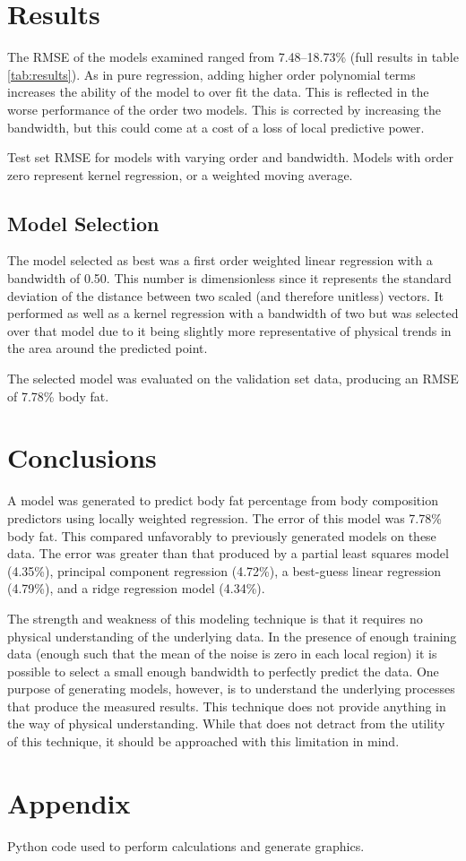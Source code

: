 \documentclass{IEEEtran}
\begin{document}
\section{Results}

The RMSE of the models examined ranged from \numrange{7.48}{18.73}\% (full results in table \ref{tab:results}). As in pure regression, adding higher order polynomial terms increases the ability of the model to over fit the data. This is reflected in the worse performance of the order two models. This is corrected by increasing the bandwidth, but this could come at a cost of a loss of local predictive power. 

\begin{table}[ht]
\caption{Test set RMSE for models with varying order and bandwidth. Models with order zero represent kernel regression, or a weighted moving average.}
\label{tab:results}
\center

\end{table}

\subsection{Model Selection}
The model selected as best was a first order weighted linear regression with a bandwidth of \num{0.50}. This number is dimensionless since it represents the standard deviation of the distance between two scaled (and therefore unitless) vectors. It performed as well as a kernel regression with a bandwidth of two but was selected over that model due to it being slightly more representative of physical trends in the area around the predicted point.

The selected model was evaluated on the validation set data, producing an RMSE of \num{7.78}\% body fat.
\section{Conclusions}

A model was generated to predict body fat percentage from body composition predictors using locally weighted regression. The error of this model was \num{7.78}\% body fat. This compared unfavorably to previously generated models on these data. The error was greater than that produced by a partial least squares model (\num{4.35}\%), principal component regression (\num{4.72}\%), a best-guess linear regression (\num{4.79}\%), and a ridge regression model (\num{4.34}\%). 

The strength and weakness of this modeling technique is that it requires no physical understanding of the underlying data. In the presence of enough training data (enough such that the mean of the noise is zero in each local region) it is possible to select a small enough bandwidth to perfectly predict the data. One purpose of generating models, however, is to understand the underlying processes that produce the measured results. This technique does not provide anything in the way of physical understanding. While that does not detract from the utility of this technique, it should be approached with this limitation in mind.

\printbibliography

\onecolumn
\section{Appendix}
Python code used to perform calculations and generate graphics.
\lstset{frame=single}

\end{document}
